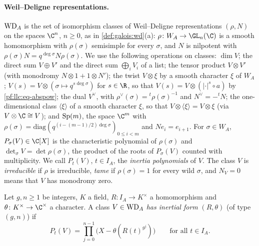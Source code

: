 \paragraph{Weil--Deligne representations.} $\mathrm{WD}_A$ is the set of isomorphism classes of
Weil--Deligne representations $(\rho,N)$ on the spaces $\C^n$, $n\ge0$, as in \cref{def:galois:wd}(a):
$\rho\colon W_A\to\GL_n(\C)$ is a smooth homomorphism with $\rho(\sigma)$ semisimple for every $\sigma$, and
$N$ is nilpotent with $\rho(\sigma)N=q^{\deg\sigma}N\rho(\sigma)$. We use the following operations on
classes: $\dim V$; the direct sum $V\oplus V'$ and the direct sum $\bigoplus_iV_i$ of a list; the tensor
product $V\otimes V'$ (with monodromy $N\otimes1+1\otimes N'$); the twist $V\otimes\xi$ by a smooth
character $\xi$ of $W_A$; $V(s)=V\otimes(\sigma\mapsto q^{s\deg\sigma})$ for $s\in\R$, so that
$V(s)=V\otimes(|\cdot|^s\circ a)$ by \eqref{pf:llc:eq-abspow}; the dual $V^\vee$, with $\rho^\vee(\sigma)=
{}^t\rho(\sigma)^{-1}$ and $N^\vee=-{}^tN$; the one-dimensional class $\langle\xi\rangle$ of a smooth
character $\xi$, so that $V\otimes\langle\xi\rangle=V\otimes\xi$ (via $V\otimes\C\cong V$); and $\operatorname{Sp}(m)$, the space $\C^m$ with
$\rho(\sigma)=\mathrm{diag}(q^{(i-(m-1)/2)\deg\sigma})_{0\le i<m}$ and $Ne_i=e_{i+1}$. For $\sigma\in W_A$,
$P_\sigma(V)\in\C[X]$ is the characteristic polynomial of $\rho(\sigma)$ and $\det_\sigma V=\det\rho(\sigma)$,
the product of the roots of $P_\sigma(V)$ counted with multiplicity. We call $P_t(V)$, $t\in I_A$, the
\emph{inertia polynomials} of $V$. The class $V$ is \emph{irreducible} if $\rho$ is irreducible,
\emph{tame} if $\rho(\sigma)=1$ for every wild $\sigma$, and $N_V=0$ means that $V$ has monodromy zero.

\begin{definition}\label{pf:llc:def-infor}
Let $g,n\ge1$ be integers, $K$ a field, $R\colon I_A\to K^\times$ a homomorphism and $\theta\colon
K^\times\to\C^\times$ a character. A class $V\in\mathrm{WD}_A$ \emph{has inertial form} $(R,\theta)$ (of type
$(g,n)$) if
\[
  P_t(V)=\prod_{j=0}^{n-1}\bigl(X-\theta(R(t)^{g^j})\bigr)\qquad\text{for all }t\in I_A.
\]
\end{definition}

